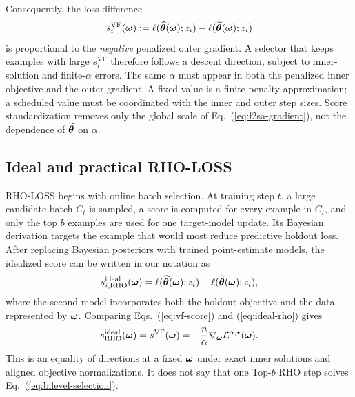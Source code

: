 Consequently, the loss difference
\begin{equation}
s_i^{\mathrm{VF}}({\bm{\omega}})
:=\ell(\widehat{{\bm{\theta}}}({\bm{\omega}});z_i)
-\ell(\widetilde{{\bm{\theta}}}({\bm{\omega}});z_i)
\label{eq:vf-score}
\end{equation}
is proportional to the \emph{negative} penalized outer gradient. A selector
that keeps examples with large $s_i^{\mathrm{VF}}$ therefore follows a descent
direction, subject to inner-solution and finite-$\alpha$ errors. The same
$\alpha$ must appear in both the penalized inner objective and the outer
gradient. A fixed value is a finite-penalty approximation; a scheduled value
must be coordinated with the inner and outer step sizes. Score
standardization removes only the global scale of Eq.~(\ref{eq:f2sa-gradient}),
not the dependence of $\widetilde{{\bm{\theta}}}$ on $\alpha$.

\subsection{Ideal and practical RHO-LOSS}

RHO-LOSS begins with online batch selection. At training step $t$, a large
candidate batch $C_t$ is sampled, a score is computed for every example in
$C_t$, and only the top $b$ examples are used for one target-model update. Its
Bayesian derivation targets the example that would most reduce predictive
holdout loss. After replacing Bayesian posteriors with trained point-estimate
models, the idealized score can be written in our notation as
\begin{equation}
s_{i,\mathrm{RHO}}^{\mathrm{ideal}}({\bm{\omega}})
=\ell(\widehat{{\bm{\theta}}}({\bm{\omega}});z_i)
-\ell(\widetilde{{\bm{\theta}}}({\bm{\omega}});z_i),
\label{eq:ideal-rho}
\end{equation}
where the second model incorporates both the holdout objective and the data
represented by ${\bm{\omega}}$. Comparing Eqs.~(\ref{eq:vf-score}) and
(\ref{eq:ideal-rho}) gives
\begin{equation}
s_{\mathrm{RHO}}^{\mathrm{ideal}}({\bm{\omega}})
=s^{\mathrm{VF}}({\bm{\omega}})
=-\frac{n}{\alpha}
\nabla_{{\bm{\omega}}}\mathcal{L}^{\alpha,\star}({\bm{\omega}}).
\label{eq:rho-vf-equivalence}
\end{equation}
This is an equality of directions at a fixed ${\bm{\omega}}$ under exact inner
solutions and aligned objective normalizations. It does not say that one
Top-$b$ RHO step solves Eq.~(\ref{eq:bilevel-selection}).

